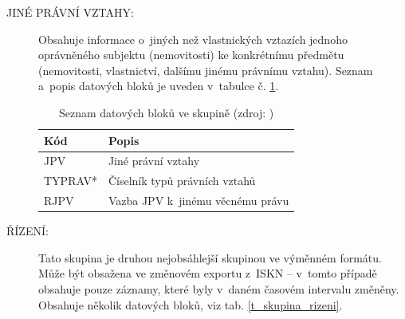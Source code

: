 \documentclass[a4paper,12pt,oneside]{book}
\begin{document}
\begin{description}
 \item[JINÉ PRÁVNÍ VZTAHY:] Obsahuje informace o~jiných než vlastnických vztazích jednoho oprávněného subjektu (nemovitosti) ke konkrétnímu předmětu (nemovitosti, vlastnictví, dalšímu jinému právnímu vztahu). Seznam a~popis datových bloků je uveden v~tabulce č. \ref{t_skupina_jpv}. \cite{dp_landa}
 
\begin{table}[htbp]
\centering
\caption[Seznam datových bloků ve skupině ]{Seznam datových bloků ve skupině  (zdroj: \cite{vfk_struktura})}
\begin{tabular}{ll}
\toprule
\textbf{Kód} & \textbf{Popis} \\ 
\midrule
JPV & Jiné právní vztahy \\ 
TYPRAV* & Číselník typů právních vztahů \\ 
RJPV & Vazba JPV k~jinému věcnému právu \\ 
\bottomrule
\end{tabular}
\label{t_skupina_jpv}
\end{table}

 \item[ŘÍZENÍ:] Tato skupina je druhou nejobsáhlejší skupinou ve výměnném formátu. Může být obsažena ve změnovém exportu z~ISKN -- v~tomto případě obsahuje pouze záznamy, které byly v~daném časovém intervalu změněny. Obsahuje několik datových bloků, viz tab. \ref{t_skupina_rizeni}. \cite{dp_landa}
 

\end{description}
\end{document}
